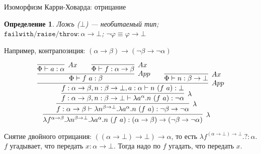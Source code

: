 \documentclass[aspectratio=169]{beamer}
\newtheorem{dfn}{Определение}[section]
\begin{document}
\begin{frame}{Изоморфизм Карри-Ховарда: отрицание}

\begin{dfn}Ложь ($\bot$) --- необитаемый тип;
$\texttt{failwith/raise/throw} : \alpha\rightarrow\bot$; $\neg\varphi\equiv\varphi\rightarrow\bot$
 \end{dfn}

Например, контрапозиция:
$(\alpha\rightarrow\beta)\rightarrow(\neg\beta\rightarrow\neg\alpha)$

$$\infer[\lambda]{\lambda f^{\alpha\rightarrow\beta}.\lambda n^{\beta\rightarrow\bot}.\lambda a^\alpha.n\ (f\ a): (\alpha\rightarrow\beta)\rightarrow(\neg\beta\rightarrow\neg\alpha)}
        {\infer[\lambda]{f:\alpha\rightarrow\beta\vdash\lambda n^{\beta\rightarrow\bot}.\lambda a^\alpha.n\ (f\ a): \neg\beta\rightarrow\neg\alpha}
               {\infer[\lambda]{f:\alpha\rightarrow\beta,n:\beta\rightarrow\bot\vdash\lambda a^\alpha.n\ (f\ a): \neg\alpha}{
                       \infer[App]{f:\alpha\rightarrow\beta,n:\beta\rightarrow\bot, a:\alpha \vdash n\ (f\ a): \bot}{
                              \infer[App]{\Phi \vdash f\ a: \beta}{\infer[Ax]{\Phi \vdash a: \alpha}{}\quad\quad\infer[Ax]{\Phi \vdash f:\alpha\rightarrow\beta}{}}
    \quad\quad \infer[Ax]{\Phi \vdash n: \beta\rightarrow\bot}{}
               }
               }}}$$

Снятие двойного отрицания: $((\alpha\rightarrow\bot)\rightarrow\bot)\rightarrow\alpha$, то есть $\lambda f^{(\alpha\rightarrow\bot)\rightarrow\bot}.?: \alpha$.\\
$f$ угадывает, что передать $x: \alpha\rightarrow\bot$. Тогда надо по $f$ угадать, что передать $x$.
\end{frame}
\end{document}
